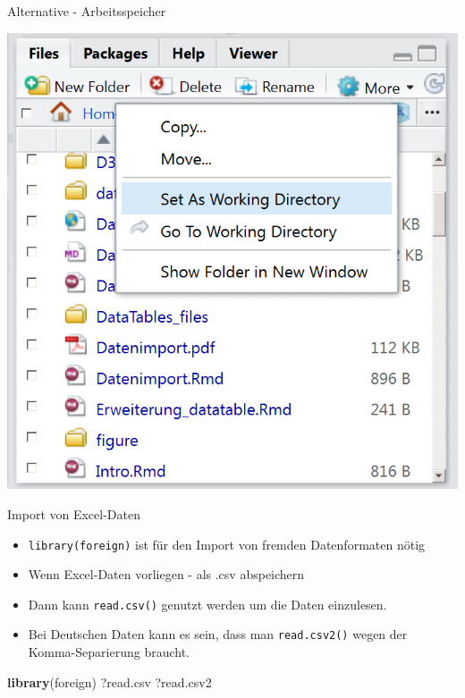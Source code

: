 \documentclass[
  ignorenonframetext,
]{beamer}
\newenvironment{Shaded}{\begin{snugshade}}{\end{snugshade}}
\newcommand{\KeywordTok}[1]{\textcolor[rgb]{0.26,0.66,0.93}{\textbf{#1}}}
\newcommand{\NormalTok}[1]{\textcolor[rgb]{0.74,0.68,0.62}{#1}}
\providecommand{\tightlist}{%
  \setlength{\itemsep}{0pt}\setlength{\parskip}{0pt}}
\begin{document}
\begin{frame}{Alternative - Arbeitsspeicher}
\protect\hypertarget{alternative---arbeitsspeicher}{}

\includegraphics{figure/SetWD.PNG}

\end{frame}

\begin{frame}[fragile]{Import von Excel-Daten}
\protect\hypertarget{import-von-excel-daten}{}

\begin{itemize}
\tightlist
\item
  \texttt{library(foreign)} ist für den Import von fremden Datenformaten
  nötig
\item
  Wenn Excel-Daten vorliegen - als .csv abspeichern
\item
  Dann kann \texttt{read.csv()} genutzt werden um die Daten einzulesen.
\item
  Bei Deutschen Daten kann es sein, dass man \texttt{read.csv2()} wegen
  der Komma-Separierung braucht.
\end{itemize}

\begin{Shaded}
\begin{Highlighting}[]
\KeywordTok{library}\NormalTok{(foreign)}
\NormalTok{?read.csv}
\NormalTok{?read.csv2}
\end{Highlighting}
\end{Shaded}

\end{frame}
\end{document}
